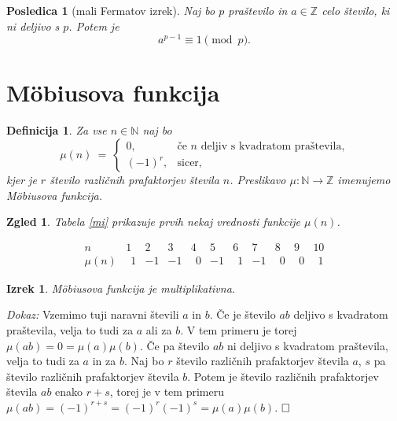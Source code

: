 \documentclass[a4paper,12pt]{article}
\def\N{\mathbb{N}} %
\def\Z{\mathbb{Z}} %
\def\qed{$\hfill\Box$}   %
\newtheorem{izrek}{Izrek}
\newtheorem{posledica}{Posledica}
\newtheorem{definicija}{Definicija}
\newtheorem{zgled}{Zgled}
\begin{document}
\begin{posledica}[mali Fermatov izrek]
Naj bo $p$ praštevilo in $a \in \Z$ celo število, ki ni deljivo s $p$. Potem je
\[
a^{p-1} \equiv 1 \pmod{p}.
\]
\end{posledica}



\section{M\"obiusova funkcija}


\begin{definicija}
Za vse $n \in \N$ naj bo
\[
\mu(n)\ =\ \left\{
\begin{array}{cl}
0, & \mbox{če\ } n \mbox{\ deljiv s kvadratom praštevila,} \\
(-1)^r, & \mbox{sicer,}
\end{array}
\right.
\]
kjer je $r$ število različnih prafaktorjev števila $n$.
Preslikavo $\mu: \N \to \Z$ imenujemo \em{M\"obiusova funkcija}.
\end{definicija}

\begin{zgled}
Tabela \ref{mi} prikazuje prvih nekaj vrednosti funkcije $\mu(n)$. 
\begin{table}[h]
\[
\begin{array}{c|*{10}{r}}
   n   & 1 & 2 & 3 & 4 & 5 & 6 & 7 & 8 & 9 & 10 \\
\hline
\mu(n) & \ \ 1 & -1 & -1 & \ \ 0 & -1 & \ \ 1 & -1 & \ \ 0 & \ \ 0 & \ \ 1
\end{array}
\]
\caption{Vrednosti funkcije $\mu(n)$}\label{mi}
\end{table}
\end{zgled}


\begin{izrek}
\label{mimult}
M\"obiusova funkcija je multiplikativna.
\end{izrek}

\noindent
{\em Dokaz:\/} Vzemimo tuji naravni števili $a$ in $b$. Če je število $ab$ deljivo s kvadratom praštevila,
velja to tudi za $a$ ali za $b$. V tem primeru je torej $\mu(ab) = 0 = \mu(a)\mu(b)$.
Če pa število $ab$ ni deljivo s kvadratom praštevila, velja to tudi za $a$ in za $b$. Naj bo $r$ število različnih
prafaktorjev števila $a$, $s$ pa število različnih prafaktorjev števila $b$. Potem je število različnih 
prafaktorjev števila $ab$ enako $r+s$, torej je v tem primeru $\mu(ab) = (-1)^{r+s} = (-1)^r (-1)^s = \mu(a)\mu(b)$.
\qed
\end{document}
